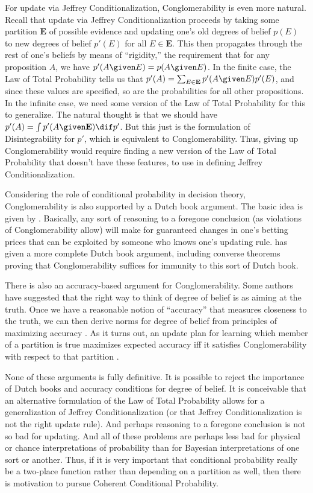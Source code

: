 For update via Jeffrey Conditionalization, Conglomerability is even more natural. Recall that update via Jeffrey Conditionalization proceeds by taking some partition $\mathbf{E}$ of possible evidence and updating one's old degrees of belief $p(E)$ to new degrees of belief $p'(E)$ for all $E\in \mathbf{E}$. This then propagates through the rest of one's beliefs by means of ``rigidity,'' the requirement that for any proposition $A$, we have $p'(A \given E)=p(A \given E)$. In the finite case, the Law of Total Probability tells us that $p'(A)=\sum_{E\in\mathbf{E}}p'(A \given E)p'(E)$, and since these values are specified, so are the probabilities for all other propositions. In the infinite case, we need some version of the Law of Total Probability for this to generalize. The natural thought is that we should have $p'(A)=\int p'(A \given \mathbf{E}) \dif p'$. But this just is the formulation of Disintegrability for $p'$, which is equivalent to Conglomerability. Thus, giving up Conglomerability would require finding a new version of the Law of Total Probability that doesn't have these features, to use in defining Jeffrey Conditionalization.

Considering the role of conditional probability in decision theory, Conglomerability is also supported by a Dutch book argument. The basic idea is given by \citet[p.\ 431]{billingsley}. Basically, any sort of reasoning to a foregone conclusion (as violations of Conglomerability allow) will make for guaranteed changes in one's betting prices that can be exploited by someone who knows one's updating rule.  \citet{rescorlaconglom} has given a more complete Dutch book argument, including converse theorems proving that Conglomerability suffices for immunity to this sort of Dutch book.

There is also an accuracy-based argument for Conglomerability. Some authors have suggested that the right way to think of degree of belief is as aiming at the truth. Once we have a reasonable notion of ``accuracy'' that measures closeness to the truth, we can then derive norms for degree of belief from principles of maximizing accuracy \citep{nonprag,grvwlc,pettbook}. As it turns out, an update plan for learning which member of a partition is true maximizes expected accuracy iff it satisfies Conglomerability with respect to that partition \citep{expectacc}.

None of these arguments is fully definitive. It is possible to reject the importance of Dutch books and accuracy conditions for degree of belief. It is conceivable that an alternative formulation of the Law of Total Probability allows for a generalization of Jeffrey Conditionalization (or that Jeffrey Conditionalization is not the right update rule). And perhaps reasoning to a foregone conclusion is not so bad for updating. And all of these problems are perhaps less bad for physical or chance interpretations of probability than for Bayesian interpretations of one sort or another. Thus, if it is very important that conditional probability really be a two-place function rather than depending on a partition as well, then there is motivation to pursue Coherent Conditional Probability.

